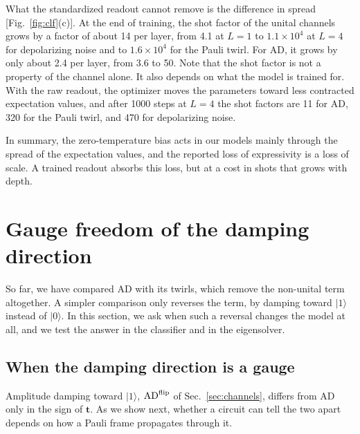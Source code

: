 \documentclass[
 aps,pra,
 twocolumn,
 superscriptaddress,
 longbibliography,
 nofootinbib
]{revtex4-2}
\providecommand{\ket}[1]{\lvert #1 \rangle}
\newcommand{\AD}{\mathrm{AD}}
\begin{document}
What the standardized readout cannot remove is the difference in spread
[Fig.~\ref{fig:clf}(c)]. At the end of training, the shot factor of the unital
channels grows by a factor of about 14 per layer, from 4.1 at $L=1$ to
$1.1\times10^4$ at $L=4$ for depolarizing noise and to $1.6\times10^4$ for the
Pauli twirl. For AD, it grows by only about 2.4 per layer, from 3.6 to 50. Note
that the shot factor is not a property of the channel alone. It also depends on
what the model is trained for. With the raw readout, the optimizer moves the
parameters toward less contracted expectation values, and after 1000 steps at $L=4$ the
shot factors are 11 for AD, 320 for the Pauli twirl, and 470 for depolarizing
noise.

In summary, the zero-temperature bias acts in our models mainly through the spread of
the expectation values, and the reported loss of expressivity is a loss of
scale. A trained readout absorbs
this loss, but at a cost in shots that grows with depth.

\section{Gauge freedom of the damping direction}
\label{sec:gauge}

So far, we have compared AD with its twirls, which remove the non-unital term
altogether. A simpler comparison only reverses the term, by damping toward
$\ket1$ instead of $\ket0$. In this section, we ask when such a reversal
changes the model at all, and we test the answer in the classifier and in the
eigensolver.

\subsection{When the damping direction is a gauge}
\label{sec:gauge_def}

Amplitude damping toward $\ket{1}$, $\AD^{\rm flip}$ of
Sec.~\ref{sec:channels}, differs from $\AD$ only in the sign of $\mathbf t$. As we
show next, whether a circuit can tell the two apart depends on how a Pauli
frame propagates through it.
\end{document}
